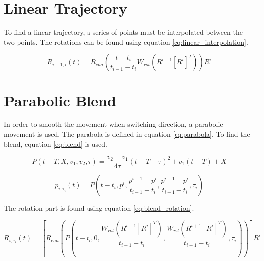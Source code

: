 \documentclass[a4paper,10pt]{article}
\begin{document}
\section{Linear Trajectory}

To find a linear trajectory, a series of points must be interpolated between the two points. 
The rotations can be found using equation \ref{eq:linear_interpolation}.

\begin{equation}
  R_{i-1, i}(t) = R_{eaa} \left( \frac{t-t_i}{t_{i-1} - t_i} W_{rot} (R^{i-1} [R^i]^T)\right) R^i 
  \label{eq:linear_interpolation}
\end{equation}



\section{Parabolic Blend}

In order to smooth the movement when switching direction, a parabolic movement is used.
The parabola is defined in equation \ref{eq:parabola}.
To find the blend, equation \ref{eq:blend} is used.

\begin{equation}
 P(t-T,X,v_1,v_2, \tau) = \frac{v_2 - v_1}{4 \tau} (t-T + \tau)^2 + v_1 (t-T) + X
\label{eq:parabola}
\end{equation}

\begin{equation}
 p_{i,\tau_i}(t) = P\left( t-t_i, p^i, \frac{p^{i-1} - p^i}{t_{i-1} - t_i}, \frac{p^{i+1} - p^i}{t_{i+1} - t_i}, \tau_i \right)  
\label{eq:blend}
 \end{equation}

The rotation part is found using equation \ref{eq:blend_rotation}.

\begin{equation}
R_{i,\tau_i}(t) = 
\left[ R_{eaa} 
  \left( 
    P\left( 
      t-t_i, 0, \frac{W_{rot}(R^{i-1} [R^i]^T)}{t_{i-1} - t_i}, \frac{W_{rot}(R^{i+1} [R^i]^T)}{t_{i+1} - t_i}, \tau_i
     \right) 
  \right) 
\right] R^i
 \label{eq:blend_rotation}
\end{equation}
\end{document}
